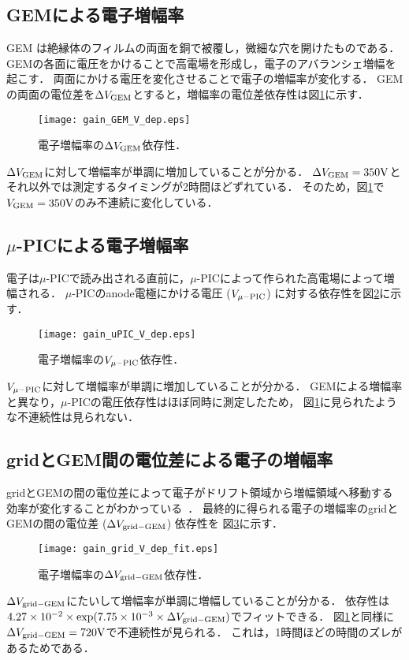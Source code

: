\documentclass[../master]{subfiles}
\begin{document}
\subsection{GEMによる電子増幅率}
GEM は絶縁体のフィルムの両面を銅で被覆し，微細な穴を開けたものである．
GEMの各面に電圧をかけることで高電場を形成し，電子のアバランシェ増幅を起こす．
両面にかける電圧を変化させることで電子の増幅率が変化する．
GEMの両面の電位差を$\Delta V_{\rm GEM}$とすると，増幅率の電位差依存性は図\ref{fig::gain_GEM_V_dep}に示す．
\begin{figure}
  \centering
  \texttt{[image: gain\_GEM\_V\_dep.eps]}
  \caption{電子増幅率の$\Delta V_{\rm GEM}$依存性．}
  \label{fig::gain_GEM_V_dep}
\end{figure}
$\Delta V_{\rm GEM}$に対して増幅率が単調に増加していることが分かる．
$\Delta V_{\rm GEM} = 350 {\rm V}$とそれ以外では測定するタイミングが2時間ほどずれている．
そのため，図\ref{fig::gain_GEM_V_dep}で$V_{\rm GEM} = 350 {\rm V}$のみ不連続に変化している．

\subsection{$\mu$-PICによる電子増幅率}
電子は$\mu$-PICで読み出される直前に，$\mu$-PICによって作られた高電場によって増幅される．
$\mu$-PICのanode電極にかける電圧 ($V_{\rm\mu-PIC}$) に対する依存性を図\ref{fig::gain_uPIC_V_dep}に示す．
\begin{figure}
  \centering
  \texttt{[image: gain\_uPIC\_V\_dep.eps]}
  \caption{電子増幅率の$V_{\rm\mu-PIC}$依存性．}
  \label{fig::gain_uPIC_V_dep}
\end{figure}
$V_{\rm\mu-PIC}$に対して増幅率が単調に増加していることが分かる．
GEMによる増幅率と異なり，$\mu$-PICの電圧依存性はほぼ同時に測定したため，
図\ref{fig::gain_GEM_V_dep}に見られたような不連続性は見られない．

\subsection{gridとGEM間の電位差による電子の増幅率}
gridとGEMの間の電位差によって電子がドリフト領域から増幅領域へ移動する効率が変化することがわかっている~\cite{furuno}．
最終的に得られる電子の増幅率のgridとGEMの間の電位差 ($\Delta V_{\rm grid-GEM}$) 依存性を
図\ref{fig::gain_grid_GEM_V_dep}に示す．
\begin{figure}
  \centering
  \texttt{[image: gain\_grid\_V\_dep\_fit.eps]}
  \caption{電子増幅率の$\Delta V_{\rm grid-GEM}$依存性．}
  \label{fig::gain_grid_GEM_V_dep}
\end{figure}
$\Delta V_{\rm grid-GEM}$にたいして増幅率が単調に増幅していることが分かる．
依存性は$4.27\times 10^{-2}\times \exp(7.75\times 10^{-3}\times \Delta V_{\rm grid-GEM})$でフィットできる．
図\ref{fig::gain_GEM_V_dep}と同様に$\Delta V_{\rm grid-GEM} = 720 {\rm V}$で不連続性が見られる．
これは，1時間ほどの時間のズレがあるためである．
\end{document}
